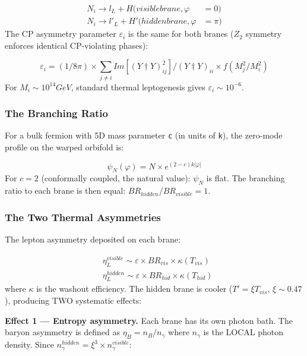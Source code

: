 \documentclass[aps,prd,preprint,superscriptaddress,longbibliography]{revtex4-2}
\begin{document}
\begin{align}
    N_i \to l_L + H        (visible brane, \varphi &= 0) \\
    N_i \to l'_L + H'      (hidden brane, \varphi &= \pi)
\end{align}
The CP asymmetry parameter $\varepsilon_i$ is the same for both branes ($Z_{2}$ symmetry enforces identical CP-violating phases):


\begin{equation}
    \varepsilon_i = (1/8\pi) \times \sum_{j\neq i} Im[(Y\dagger Y)^{2}_{ij}] / (Y\dagger Y)_{ii} \times f(M_j^{2}/M_i^{2})
\end{equation}
For $M_i \sim  10^{14} GeV$, standard thermal leptogenesis gives $\varepsilon_i \sim  10^{-6}$.


\subsubsection{The Branching Ratio}

For a bulk fermion with 5D mass parameter \texttt{c} (in units of \texttt{k}), the zero-mode profile on the warped orbifold is:


\begin{equation}
    \psi_N(\varphi) = N \times e^{(2-c)k|\varphi|}
\end{equation}
For $c = 2$ (conformally coupled, the natural value): $\psi_N$ is flat. The branching ratio to each brane is then equal: $BR_{hidden}/BR_{visible} = 1$.


\subsubsection{The Two Thermal Asymmetries}

The lepton asymmetry deposited on each brane:


\begin{align}
    & \eta_L^{visible} \sim  \varepsilon \times BR_{vis} \times \kappa(T_{vis}) \\
    & \eta_L^{hidden}  \sim  \varepsilon \times BR_{hid} \times \kappa(T_{hid})
\end{align}
where $\kappa$ is the washout efficiency. The hidden brane is cooler ($T' = \xi T_{vis}$, $\xi \sim  0.47$), producing TWO systematic effects:

\textbf{Effect 1 --- Entropy asymmetry.} Each brane has its own photon bath. The baryon asymmetry is defined as $\eta_B = n_B/n_\gamma$ where $n_\gamma$ is the LOCAL photon density. Since $n_\gamma^{hidden} = \xi^{3} \times n_\gamma^{visible}$:
\end{document}
